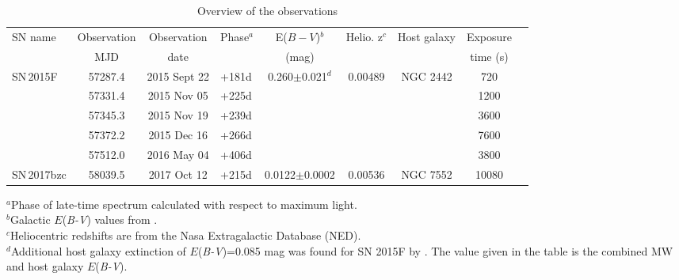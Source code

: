 \documentclass[fleqn,usenatbib]{mnras}
\begin{document}
\begin{table}
	\caption{Overview of the observations}
	\label{tab:Observations}
    \begin{tabular}{lcclccccc}
    	\hline 
    	SN name   & Observation & Observation & Phase$^a$     & E($B-V$)$^b$ & Helio. z$^c$ & Host galaxy & Exposure \\
                  & MJD         & date        &  & (mag)    &          &             & time (s) \\
		\hline                   
        
        SN\,2015F   & 57287.4     & 2015 Sept 22& +181d & 0.260$\pm$0.021$^d$ & 0.00489 & NGC 2442 & 720\\
                  & 57331.4     & 2015 Nov 05 & +225d &                     & & & 1200\\
                  & 57345.3     & 2015 Nov 19 & +239d &                     & & & 3600\\
                  & 57372.2     & 2015 Dec 16 & +266d &                     & & & 7600\\
                  & 57512.0     & 2016 May 04 & +406d &                     & & & 3800\\
        SN\,2017bzc & 58039.5     & 2017 Oct 12 & +215d & 0.0122$\pm$0.0002   & 0.00536 & NGC 7552 & 10080\\
		\hline
			\end{tabular}
		\begin{flushleft}
         $^a$Phase of late-time spectrum calculated with respect to maximum light. \\
         $^b$Galactic $E$(\textit{B-V}) values from \protect \cite{2011ApJ...737..103S}.\\
         $^c$Heliocentric redshifts are from the Nasa Extragalactic Database (NED).\\
         $^d$Additional host galaxy extinction of $E$(\textit{B-V})=0.085 mag was found for SN 2015F by \citet{2017MNRAS.464.4476C}. The value given in the table is the combined MW and host galaxy $E$(\textit{B-V}). \\
 \end{flushleft}
 \end{table}
\end{document}
